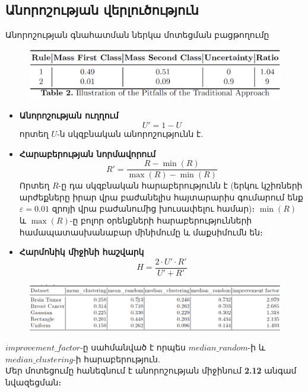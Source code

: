 \documentclass[aspectratio=169]{beamer}
\begin{document}
\subsection{Անորոշության վերլուծություն}
\begin{frame}{{\rm Անորոշության գնահատման ներկա մոտեցման բացթողումը}}
\begin{figure}
    \centering
    \includegraphics[width=1\linewidth]{pitfalls.png}
\end{figure}
\end{frame}

\begin{frame}
\begin{itemize}
\item \textbf{Անորոշության ուղղում}
    \[
    U' = 1 - U
    \]
    որտեղ \( U \)-ն սկզբնական անորոշությունն է.
    \pause
    \item \textbf{Հարաբերության նորմավորում}
    \[
    R' = \frac{R - \min(R)}{\max(R) - \min(R)}
    \]
    Որտեղ \( R \)-ը դա սկզբնական հարաբերությունն է (երկու կշիռների արժեքները իրար վրա բաժանելիս հայտարարիս գումարում ենք $\varepsilon=0.01$ զրոյի վրա բաժանումից խուսափելու համար)։ \( \min(R) \) և \( \max(R) \)-ը բոլոր օրենքների հարաբերությունների համապատասխանաբար մինիմումը և մաքսիմումն են։
    \pause
    \item \textbf{Հարմոնիկ միջինի հաշվարկ}
    \[
    H = \frac{2 \cdot U' \cdot R'}{U' + R'}
    \]
     
\end{itemize}
\end{frame}

\begin{frame}
\begin{figure}
    \centering
    \includegraphics[width=1\linewidth]{unc_df.png}
\end{figure}
{\rm $improvement\_factor$}-ը սահմանված է որպես $median\_random$-ի և $median\_clustering$-ի հարաբերություն. \\ \pause
Մեր մոտեցումը հանեգնում է  անորոշության միջինում \textbf{2.12} անգամ նվազեցման։
    
\end{frame}
\end{document}
